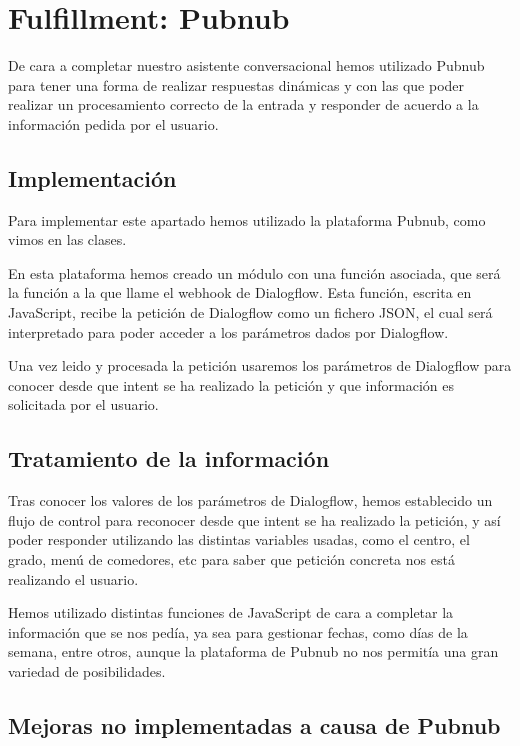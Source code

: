 
\section{Fulfillment: Pubnub}

De cara a completar nuestro asistente conversacional hemos utilizado Pubnub para tener una forma de realizar respuestas dinámicas y con las que poder realizar un procesamiento correcto de la entrada y responder de acuerdo a la información pedida por el usuario.

\subsection{Implementación}

Para implementar este apartado hemos utilizado la plataforma Pubnub, como vimos en las clases.

En esta plataforma hemos creado un módulo con una función asociada, que será la función a la que llame el webhook de Dialogflow. Esta función, escrita en JavaScript, recibe la petición de Dialogflow como un fichero JSON, el cual será interpretado para poder acceder a los parámetros dados por Dialogflow.

Una vez leido y procesada la petición usaremos los parámetros de Dialogflow para conocer desde que intent se ha realizado la petición y que información es solicitada por el usuario.

\subsection{Tratamiento de la información}

Tras conocer los valores de los parámetros de Dialogflow, hemos establecido un flujo de control para reconocer desde que intent se ha realizado la petición, y así poder responder utilizando las distintas variables usadas, como el centro, el grado, menú de comedores, etc para saber que petición concreta nos está realizando el usuario.

Hemos utilizado distintas funciones de JavaScript de cara a completar la información que se nos pedía, ya sea para gestionar fechas, como días de la semana, entre otros, aunque la plataforma de Pubnub no nos permitía una gran variedad de posibilidades.


\subsection{Mejoras no implementadas a causa de Pubnub}

